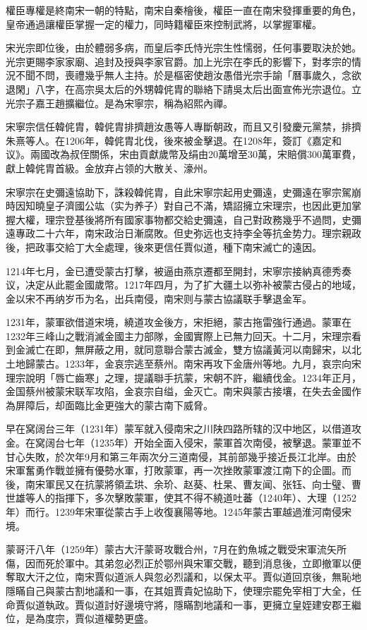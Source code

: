 權臣專權是終南宋一朝的特點，南宋自秦檜後，權臣一直在南宋發揮重要的角色，皇帝通過讓權臣掌握一定的權力，同時籍權臣來控制武將，以掌握軍權。

宋光宗即位後，由於體弱多病，而皇后李氏恃光宗生性懦弱，任何事要取決於她。光宗更賜李家家廟、追封及授與李家官爵。加上光宗在李氏的影響下，對孝宗的情況不聞不問，喪禮幾乎無人主持。於是樞密使趙汝愚借光宗手諭「曆事歲久，念欲退閑」八字，在高宗吳太后的外甥韓侂胄的聯絡下請吳太后出面宣佈光宗退位。立光宗子嘉王趙擴繼位。是為宋寧宗，稱為紹熙內禪。

宋寧宗信任韓侂胄，韓侂胄排擠趙汝愚等人專斷朝政，而且又引發慶元黨禁，排擠朱熹等人。在1206年，韓侂胄北伐，後來被金擊退。在1208年，簽訂《嘉定和议》。兩國改為叔侄關係，宋由貢獻歲幣及绢由20萬增至30萬，宋賠償300萬軍費，獻上韓侂胄首級。金放弃占领的大散关、濠州。

宋寧宗在史彌遠協助下，誅殺韓侂胄，自此宋寧宗起用史彌遠，史彌遠在寧宗駕崩時因知曉皇子濟國公竑（实为养子）對自己不滿，矯詔擁立宋理宗，也因此更加掌握大權，理宗登基後將所有國家事物都交給史彌遠，自己對政務幾乎不過問，史彌遠專政二十六年，南宋政治日漸腐敗。但史弥远也支持李全等抗金势力。理宗親政後，把政事交給丁大全處理，後來更信任賈似道，種下南宋滅亡的遠因。

1214年七月，金已遭受蒙古打擊，被逼由燕京遷都至開封，宋寧宗接納真德秀奏议，决定从此罷金國歲幣。1217年四月，为了扩大疆土以弥补被蒙古侵占的地域，金以宋不再纳岁币为名，出兵南侵，南宋则与蒙古協議联手擊退金军。

1231年，蒙軍欲借道宋境，繞道攻金後方，宋拒絕，蒙古拖雷強行通過。蒙軍在1232年三峰山之戰消滅金國主力部隊，金國實際上已無力回天。十二月，宋理宗看到金滅亡在即，無屏蔽之用，就同意聯合蒙古滅金，雙方協議黃河以南歸宋，以北土地歸蒙古。1233年，金哀宗逃至蔡州。南宋再攻下金唐州等地。九月，哀宗向宋理宗說明「唇亡齒寒」之理，提議聯手抗蒙，宋朝不許，繼續伐金。1234年正月，金国蔡州被蒙宋联军攻陷，金哀宗自缢，金灭亡。南宋與蒙古接壤，在失去金國作為屏障后，却面臨比金更強大的蒙古南下威脅。

早在窝阔台三年（1231年）蒙军就入侵南宋之川陕四路所辖的汉中地区，以借道攻金。在窝阔台七年（1235年）开始全面入侵宋，蒙軍首次南侵，被擊退。蒙軍並不甘心失敗，於次年9月和第三年兩次分三道南侵，其前部幾乎接近長江北岸。由於宋軍奮勇作戰並擁有優勢水軍，打敗蒙軍，再一次挫敗蒙軍渡江南下的企圖。而後，南宋軍民又在抗蒙將領孟珙、余玠、赵葵、杜杲、曹友闻、张钰、向士璧、曹世雄等人的指揮下，多次擊敗蒙軍，使其不得不繞道吐蕃（1240年）、大理（1252年）而行。1239年宋軍從蒙古手上收復襄陽等地。1245年蒙古軍越過淮河南侵宋境。

蒙哥汗八年（1259年）蒙古大汗蒙哥攻戰合州，7月在釣魚城之戰受宋軍流矢所傷，因而死於軍中。其弟忽必烈正於鄂州與宋軍交戰，聽到消息後，立即撤軍以便奪取大汗之位，南宋賈似道派人與忽必烈議和，以保太平。賈似道回京後，無恥地隱瞞自己與蒙古割地議和一事，在其姐賈貴妃協助下，使理宗罷免宰相丁大全，任命賈似道執政。賈似道討好邊境守將，隱瞞割地議和一事，更擁立皇姪建安郡王繼位，是為度宗，賈似道權勢更盛。

